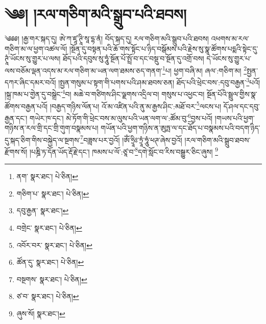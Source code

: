 \setcounter{footnote}{0} 
\chapter{༄༅། །རལ་གཅིག་མའི་སྒྲུབ་པའི་ཐབས།}༄༅༅། །རྒྱ་གར་སྐད་དུ། ཨེ་ཀ་ཛཱ་ཊཱི་སཱ་དྷ་ནཾ། བོད་སྐད་དུ། རལ་གཅིག་མའི་སྒྲུབ་པའི་ཐབས། འཕགས་མ་རལ་གཅིག་མ་ལ་ཕྱག་འཚལ་ལོ། །སྔོན་དུ་བསྟན་པའི་ཆོ་གས་སྟོང་པ་ཉིད་བསྒོམས་པའི་རྗེས་སུ་སྣ་ཚོགས་པདྨའི་སྟེང་དུ་ཊཱཾ་ཡོངས་སུ་གྱུར་པ་ལས། ཐོད་པའི་དབུས་སུ་ཧཱུཾ་སྔོན་པོ་སྤྲོ་བ་དང་བསྡུ་བ་སྔོན་དུ་འགྲོ་བས། དེ་ཡོངས་སུ་གྱུར་པ་ལས་བཅོམ་ལྡན་འདས་མ་རལ་གཅིག་མ་ཡན་ལག་ཐམས་ཅད་གནག་\footnote{ནག་  སྣར་ཐང་།  པེ་ཅིན། }པ། ཕྱག་བཞི་མ། ཞལ་:གཅིག་མ། \footnote{གཅིག་པ་  སྣར་ཐང་།  པེ་ཅིན། }སྤྱན་དཀར་ཞིང་དམར་བའོ། །སྤྱན་གསུམ་པ་སྟག་གི་པགས་པའི་ཤམ་ཐབས་ཅན། ཐོད་པའི་ཕྲེང་བས་:དབུ་བརྒྱན་\footnote{དབུ་རྒྱན་  སྣར་ཐང་། }པའོ། །སྐྲ་ཁམ་པ་གྱེན་དུ་བསྒྲེང་\footnote{བགྲེང་  སྣར་ཐང་།  པེ་ཅིན། }བ། མཆེ་བ་གཙིགས་ཤིང་ལྗགས་འདྲིལ་བ། གསུས་པ་འཕྱང་བ། སྔོན་པོའི་སྦྲུལ་གྱིས་སྣ་ཚོགས་བརྒྱན་པའོ། །བརྒྱད་གཉིས་ལོན་པ། འོ་མ་འཛིན་པའི་ནུ་མ་རྒྱས་ཤིང་:མཐོ་བར་\footnote{འབོར་བར་  སྣར་ཐང་།  པེ་ཅིན། }ལངས་པ། དོ་ཤལ་དང་དབུ་རྒྱན་དང་། གཡེར་ཁ་དང་། མེ་ཏོག་གི་ཕྲེང་བས་མ་ལུས་པའི་ཡན་ལག་ལ་:ཚོམ་བུ་\footnote{ཚོན་དུ་  སྣར་ཐང་།  པེ་ཅིན། }བྱས་པའོ། །གཡས་པའི་ཕྱག་གཉིས་ན་རལ་གྲི་དང་གྲི་གུག་བསྣམས་པ། གཡོན་པའི་ཕྱག་གཉིས་ན་ཨུཏྤ་ལ་དང་ཐོད་པ་བསྣམས་པའི་བདག་ཉིད་དུ་སྐད་ཅིག་གིས་བསྐྱེད་ལ་སྔགས་\footnote{བསྔགས་  སྣར་ཐང་།  པེ་ཅིན། }བཟླས་པར་བྱའོ། །ཨོཾ་ཧྲཱིཿ་ཏྲཱཾ་ཧཱུཾ་ཕཊ་ཞེས་བྱའོ། །རལ་གཅིག་མའི་སྒྲུབ་ཐབས་རྫོགས་སོ། །པཎྜི་ཏ་དོན་ཡོད་རྡོ་རྗེ་དང་། ཁམས་པ་ལོ་:ཙཱ་བ་\footnote{ཙ་བ་  སྣར་ཐང་།  པེ་ཅིན། }དགེ་སློང་བ་རིས་བསྒྱུར་ཅིང་ཞུས། \footnote{ཞུས་སོ།   སྣར་ཐང་། }